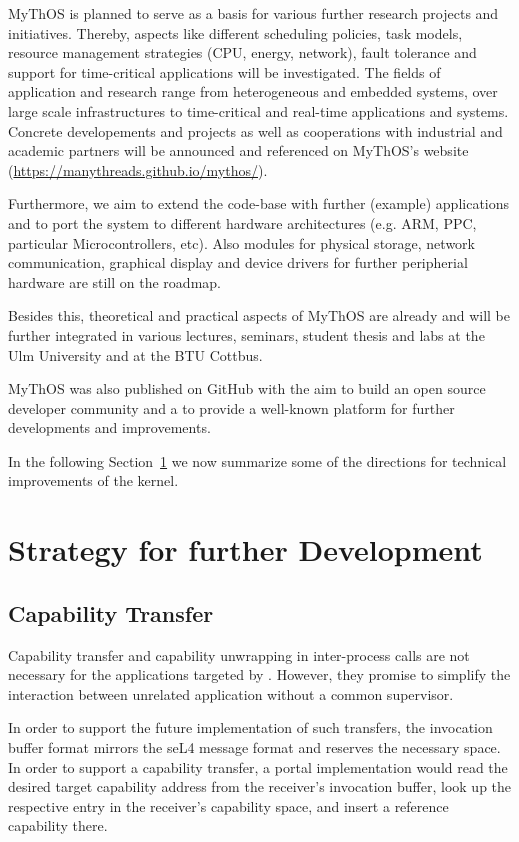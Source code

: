 MyThOS is planned to serve as a basis for various further research projects and
initiatives. Thereby, aspects like different scheduling policies, task models,
resource management strategies (CPU, energy, network), fault tolerance and
support for time-critical applications will be investigated. The fields of
application and research range from heterogeneous and embedded systems, over
large scale infrastructures to time-critical and real-time applications and
systems. Concrete developements and projects as well as cooperations with
industrial and academic partners will be announced and referenced on MyThOS's
website (\url{https://manythreads.github.io/mythos/}).

Furthermore, we aim to extend the code-base with further (example) applications
and to port the system to different hardware architectures (e.g. ARM, PPC,
particular Microcontrollers, etc). Also modules for physical storage, network
communication, graphical display and device drivers for further peripherial
hardware are still on the roadmap. 

Besides this, theoretical and practical aspects of MyThOS are already and will
be further integrated in various lectures, seminars, student thesis and labs at
the Ulm University and at the BTU Cottbus. 

MyThOS was also published on GitHub with the aim to build an open source
developer community and a to provide a well-known platform for further
developments and improvements.

In the following Section~\ref{sec:extensions} we now summarize some of the
directions for technical improvements of the kernel.

\section{Strategy for further Development}
\label{sec:extensions}

\subsection{Capability Transfer}

Capability transfer and capability unwrapping in inter-process calls
are not necessary for the applications targeted by \mythos.  However,
they promise to simplify the interaction between unrelated application
without a common supervisor.

In order to support the future implementation of such transfers, the
invocation buffer format mirrors the seL4 message format and reserves
the necessary space.  In order to support a capability transfer, a
portal implementation would read the desired target capability address
from the receiver's invocation buffer, look up the respective entry in
the receiver's capability space, and insert a reference capability
there.

